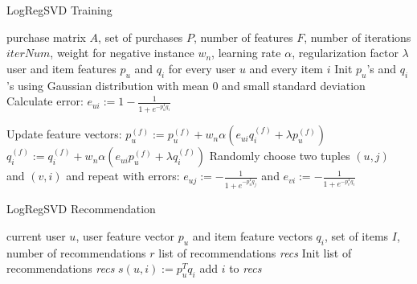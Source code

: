 \documentclass[10pt]{reportMaster}
\begin{document}
\begin{algorithm}
	\caption{LogRegSVD Training}
	\label{alg:LogRegSVDTraining}
	\begin{algorithmic}[1]
		\Require purchase matrix $A$, set of purchases $P$, number of features $F$, number of iterations $iterNum$, weight for negative instance $w_n$, learning rate $\alpha$, regularization factor $\lambda$
		\Ensure user and item features $p_u$ and $q_i$ for every user $u$ and every item $i$
		\State Init $p_u$'s and $q_i$'s using Gaussian distribution with mean $0$ and small standard deviation
				\State Calculate error:
				\State $e_{ui} := 1 - \frac{1}{1 + e^{-p_u^Tq_i}}$
				
				\State Update feature vectors:
					\State $p_u^{(f)} := p_u^{(f)} + w_n \alpha (e_{ui} q_i^{(f)} + \lambda p_u^{(f)})$
					\State $q_i^{(f)} := q_i^{(f)} + w_n \alpha (e_{ui} p_u^{(f)} + \lambda q_i^{(f)})$
				\EndFor	
				\State Randomly choose two tuples $(u,j)$ and $(v,i)$ and repeat with errors: 
				\State $e_{uj} := - \frac{1}{1 + e^{-p_u^Tq_j}}$ and
				\State $e_{vi} := - \frac{1}{1 + e^{-p_v^Tq_i}}$
			\EndFor
		\EndFor
	\end{algorithmic}	
\end{algorithm}


\begin{algorithm}
	\caption{LogRegSVD Recommendation}
	\label{alg:LogRegSVDRecommendation}
	\begin{algorithmic}[1]
		\Require current user $u$, user feature vector $p_u$ and item feature vectors $q_i$, set of items $I$, number of recommendations $r$
		\Ensure list of recommendations \textit{recs}
		\State Init list of recommendations \textit{recs}
			\State $s(u,i) := p_u^Tq_i$
			\State add $i$ to \textit{recs}
			\EndIf
		\EndFor
	\end{algorithmic}	
\end{algorithm}
\end{document}
